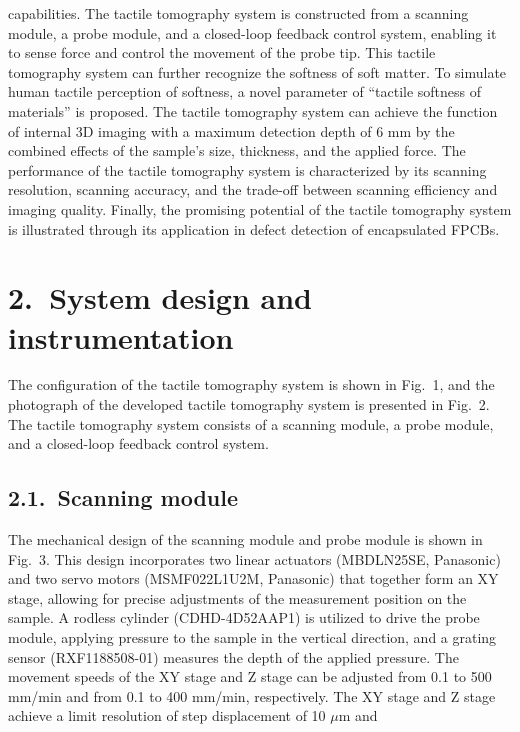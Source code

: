 \documentclass[11pt]{article}
\begin{document}
{capabilities. The tactile tomography system is constructed from a
scanning module, a probe module, and a closed-loop feedback control
system, enabling it to sense force and control the movement of the
probe tip. This tactile tomography system can further recognize the
softness of soft matter. To simulate human tactile perception of
softness, a novel parameter of ``tactile softness of materials'' is
proposed. The tactile tomography system can achieve the function of
internal 3D imaging with a maximum detection depth of 6 mm by the
combined effects of the sample's size, thickness, and the applied
force. The performance of the tactile tomography system is
characterized by its scanning resolution, scanning accuracy, and the
trade-off between scanning efficiency and imaging quality. Finally,
the promising potential of the tactile tomography system is
illustrated through its application in defect detection of
encapsulated FPCBs.}

\section*{2.\ System design and instrumentation}

The configuration of the tactile tomography system is shown in
Fig.~1, and the photograph of the developed tactile tomography
system is presented in Fig.~2. The tactile tomography system
consists of a scanning module, a probe module, and a closed-loop
feedback control system.

\subsection*{2.1.\ Scanning module}

The mechanical design of the scanning module and probe module is
shown in Fig.~3. This design incorporates two linear actuators
(MBDLN25SE, Panasonic) and two servo motors (MSMF022L1U2M, Panasonic)
that together form an XY stage, allowing for precise adjustments of
the measurement position on the sample. A rodless cylinder
(CDHD-4D52AAP1) is utilized to drive the probe module, applying
pressure to the sample in the vertical direction, and a grating
sensor (RXF1188508-01) measures the depth of the applied pressure.
The movement speeds of the XY stage and Z stage can be adjusted
from 0.1 to 500 mm/min and from 0.1 to 400 mm/min, respectively.
The XY stage and Z stage achieve a limit resolution of step
displacement of 10 $\mu$m and

\newpage
\end{document}

